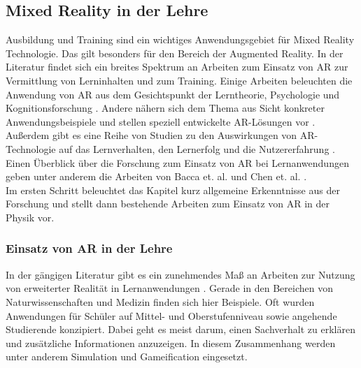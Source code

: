 \subsection{Mixed Reality in der Lehre}
\label{sec-2-3}

Ausbildung und Training sind ein wichtiges Anwendungsgebiet für Mixed Reality Technologie. Das gilt besonders für den Bereich der Augmented Reality. In der Literatur findet sich ein breites Spektrum an Arbeiten zum Einsatz von AR zur Vermittlung von Lerninhalten und zum Training. Einige Arbeiten beleuchten die Anwendung von AR aus dem Gesichtspunkt der Lerntheorie, Psychologie und Kognitionsforschung \cite{Marichal17, Santos14}. Andere nähern sich dem Thema aus Sicht konkreter Anwendungsbeispiele und stellen speziell entwickelte AR-Lösungen vor \cite{Strzys17, Amiraslanov18, Buchau09, Hughes05}. Außerdem gibt es eine Reihe von Studien zu den Auswirkungen von AR-Technologie auf das Lernverhalten, den Lernerfolg und die Nutzererfahrung \cite{Ibanez14, Li11, Jerry10, Akcayir16, Strzys18}. Einen Überblick über die Forschung zum Einsatz von AR bei Lernanwendungen geben unter anderem die Arbeiten von Bacca et. al. und Chen et. al. \cite{Chen2017, Bacca14}.\\

Im ersten Schritt beleuchtet das Kapitel kurz allgemeine Erkenntnisse aus der Forschung und stellt dann bestehende Arbeiten zum Einsatz von AR in der Physik vor.

\subsubsection{Einsatz von AR in der Lehre}
In der gängigen Literatur gibt es ein zunehmendes Maß an Arbeiten zur Nutzung von erweiterter Realität in Lernanwendungen \cite{Bacca14, Ibanez18}. Gerade in den Bereichen von Naturwissenschaften und Medizin finden sich hier Beispiele. Oft wurden Anwendungen für Schüler auf Mittel- und Oberstufenniveau sowie angehende Studierende konzipiert. Dabei geht es meist darum, einen Sachverhalt zu erklären und zusätzliche Informationen anzuzeigen. In diesem Zusammenhang werden unter anderem Simulation und Gameification eingesetzt.\\

